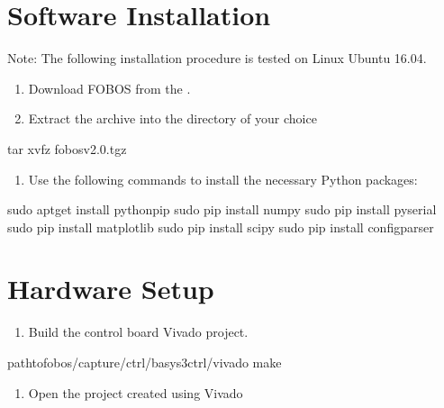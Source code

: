 \documentclass[letterpaper,10pt,english]{sphinxmanual}
\begin{document}
\section{Software Installation}
\label{\detokenize{quickstart:software-installation}}
Note: The following installation procedure is tested on Linux Ubuntu 16.04.
\begin{enumerate}
%
\item {} 
Download FOBOS from the .

\item {} 
Extract the archive into the directory of your choice

\end{enumerate}

\begin{sphinxVerbatim}[commandchars=\\\{\}]
\PYGZdl{} tar xvfz fobos\PYGZhy{}v2.0.tgz
\end{sphinxVerbatim}
\begin{enumerate}
%
\setcounter{enumi}{2}
\item {} 
Use the following commands to install the necessary Python packages:

\end{enumerate}

\begin{sphinxVerbatim}[commandchars=\\\{\}]
\PYGZdl{} sudo apt\PYGZhy{}get install python\PYGZhy{}pip
\PYGZdl{} sudo pip install numpy
\PYGZdl{} sudo pip install pyserial
\PYGZdl{} sudo pip install matplotlib
\PYGZdl{} sudo pip install scipy
\PYGZdl{} sudo pip install configparser
\end{sphinxVerbatim}


\section{Hardware Setup}
\label{\detokenize{quickstart:hardware-setup}}\begin{enumerate}
%
\item {} 
Build the control board Vivado project.

\end{enumerate}

\begin{sphinxVerbatim}[commandchars=\\\{\}]
\PYGZdl{}  path\PYGZhy{}to\PYGZhy{}fobos/capture/ctrl/basys3ctrl/vivado
\PYGZdl{} make
\end{sphinxVerbatim}
\begin{enumerate}
%
\setcounter{enumi}{1}
\item {} 
Open the project created using Vivado

\end{enumerate}
\end{document}
